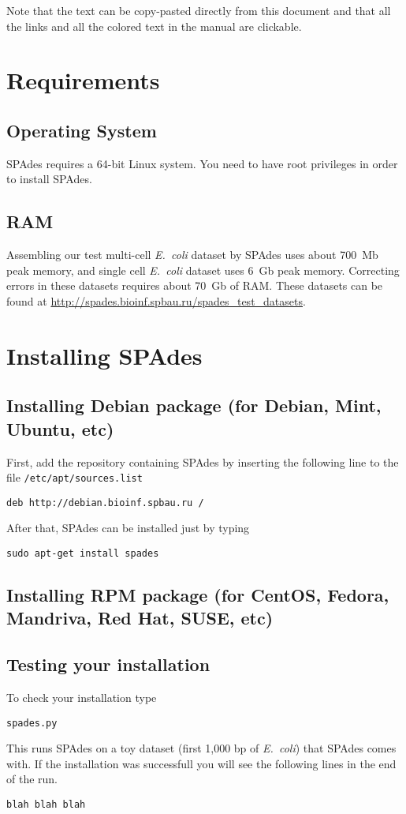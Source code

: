 \documentclass{article}
\def\spades{SPAdes}
\def\ecoli{\it E.~coli}
\begin{document}
Note that the text can be copy-pasted directly from this document
and that all the links and all the colored text in the manual are clickable.


\section{Requirements}
\subsection{Operating System}
{\spades} requires a 64-bit Linux system.
You need to have root privileges in order to install {\spades}.

\subsection{RAM}
Assembling our test multi-cell {\ecoli} dataset 
by {\spades} uses about 700~Mb peak memory, and single cell
{\ecoli} dataset uses 6~Gb peak memory. 
Correcting errors in these datasets requires about 70~Gb of RAM.
These datasets can be found at \url{http://spades.bioinf.spbau.ru/spades_test_datasets}.

\section{Installing {\spades}}
\subsection{Installing Debian package (for Debian, Mint, Ubuntu, etc)}
First, add the repository containing {\spades} by inserting the following line
to the file {\tt /etc/apt/sources.list}
\begin{lstlisting}
deb http://debian.bioinf.spbau.ru /
\end{lstlisting}
After that, {\spades} can be installed just by typing
\begin{lstlisting}
sudo apt-get install spades
\end{lstlisting}

\subsection{Installing RPM package (for CentOS, Fedora, Mandriva, Red Hat, SUSE, etc)}

\subsection{Testing your installation}
To check your installation type
\begin{lstlisting}
spades.py
\end{lstlisting}
This runs {\spades} on a toy dataset (first 1,000 bp of {\ecoli}) that {\spades} comes with. If the installation was successfull you will see the following lines in the end of the run.
\begin{lstlisting}
blah blah blah
\end{lstlisting}
\end{document}
